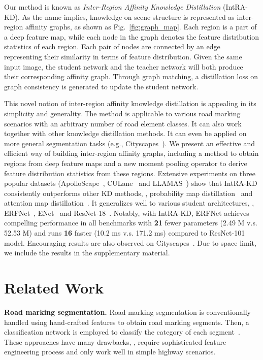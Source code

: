 \documentclass[10pt,twocolumn,letterpaper]{article}
\begin{document}
Our method is known as \textit{Inter-Region Affinity Knowledge Distillation} (IntRA-KD). 
As the name implies, knowledge on scene structure is represented as inter-region affinity graphs, as shown as Fig.~\ref{fig:graph_map}. Each region is a part of a deep feature map, while each node in the graph denotes the feature distribution statistics of each region. Each pair of nodes are connected by an edge representing their similarity in terms of feature distribution.
Given the same input image, the student network and the teacher network will both produce their corresponding affinity graph. Through graph matching, a distillation loss on graph consistency is generated to update the student network.


This novel notion of inter-region affinity knowledge distillation is appealing in its simplicity and generality. The method is applicable to various road marking scenarios with an arbitrary number of road element classes. It can also work together with other knowledge distillation methods. It can even be applied on more general segmentation tasks (e.g., Cityscapes~\cite{cordts2016cityscapes}).
We present an effective and efficient way of building inter-region affinity graphs, including a method to obtain regions from deep feature maps and a new moment pooling operator to derive feature distribution statistics from these regions.
Extensive experiments on three popular datasets (ApolloScape~\cite{huang2018apolloscape}, CULane~\cite{pan2017spatial} and LLAMAS~\cite{llamas2019}) show that IntRA-KD consistently outperforms other KD methods, \eg, probability map distillation~\cite{hinton2015distilling} and attention map distillation~\cite{zagoruyko2016paying}. It generalizes well to various student architectures, \eg, ERFNet~\cite{romera2017erfnet}, ENet~\cite{paszke2016enet} and ResNet-18~\cite{he2016deep}. Notably, with IntRA-KD, ERFNet achieves compelling performance in all benchmarks with \textbf{21} fewer parameters (2.49 M v.s. 52.53 M) and runs \textbf{16} faster (10.2 ms v.s. 171.2 ms) compared to ResNet-101 model. Encouraging results are also observed on Cityscapes~\cite{cordts2016cityscapes}. Due to space limit, we include the results in the supplementary material. 
 
\section{Related Work}
\label{sec:relatedwork}


\noindent \textbf{Road marking segmentation.} Road marking segmentation is conventionally handled using hand-crafted features to obtain road marking segments. Then, a classification network is employed to classify the category of each segment~\cite{huang2014lane, qin2013general}. These approaches have many drawbacks, \eg, require sophisticated feature engineering process and only work well in simple highway scenarios. 
\end{document}
